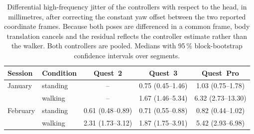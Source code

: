 \begin{table}[t]
\caption{Differential high-frequency jitter of the controllers with respect to the head, in millimetres, after correcting the constant yaw offset between the two reported coordinate frames. Because both poses are differenced in a common frame, body translation cancels and the residual reflects the controller estimate rather than the walker. Both controllers are pooled. Medians with 95\,\% block-bootstrap confidence intervals over segments.}\label{tab:ctrl_rel}
\begin{tabular}{llccc}
\toprule
Session & Condition & Quest~2 & Quest~3 & Quest~Pro \\
\midrule
January & standing & -- & 0.75 (0.45--1.46) & 1.03 (0.75--1.78) \\
 & walking & -- & 1.67 (1.46--5.34) & 6.32 (2.73--13.30) \\
\addlinespace
February & standing & 0.61 (0.48--0.89) & 0.71 (0.55--0.88) & 0.82 (0.44--1.02) \\
 & walking & 2.31 (1.73--3.12) & 1.87 (1.75--3.91) & 5.42 (2.93--6.98) \\
\bottomrule
\end{tabular}
\end{table}